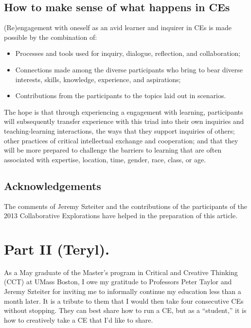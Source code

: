 \subsection{How to make sense of what happens in
CEs}\label{how-to-make-sense-of-what-happens-in-ces}

(Re)engagement with oneself as an avid learner and inquirer in CEs is
made possible by the combination of:

\begin{itemize}
\itemsep1pt\parskip0pt
\item
  Processes and tools used for inquiry, dialogue, reflection, and
  collaboration;
\item
  Connections made among the diverse participants who bring to bear
  diverse interests, skills, knowledge, experience, and aspirations;
\item
  Contributions from the participants to the topics laid out in
  scenarios.
\end{itemize}

The hope is that through experiencing a engagement with learning,
participants will subsequently transfer experience with this triad into
their own inquiries and teaching-learning interactions, the ways that
they support inquiries of others; other practices of critical
intellectual exchange and cooperation; and that they will be more
prepared to challenge the barriers to learning that are often associated
with expertise, location, time, gender, race, class, or age.

\subsection{Acknowledgements}\label{acknowledgements}

The comments of Jeremy Szteiter and the contributions of the
participants of the 2013 Collaborative Explorations have helped in the
preparation of this article.

\section*{Part II (Teryl).}\label{part-ii-teryl.}

As a May graduate of the Master's program in Critical and Creative
Thinking (CCT) at UMass Boston, I owe my gratitude to Professors Peter
Taylor and Jeremy Szteiter for inviting me to informally continue my
education less than a month later. It is a tribute to them that I would
then take four consecutive CEs without stopping. They can best share how
to run a CE, but as a ``student,'' it is how to creatively take a CE
that I'd like to share.

